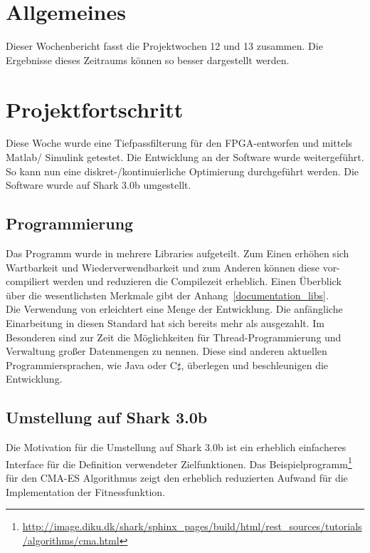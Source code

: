 \documentclass[a4paper,12pt,fleqn]{article}
\begin{document}
\setlength{\headheight}{36pt}

\begin{titlepage}



\end{titlepage}

\section[Allgemeines]{Allgemeines}
%
Dieser Wochenbericht fasst die Projektwochen 12 und 13 zusammen. Die Ergebnisse dieses Zeitraums können so besser dargestellt werden.
%
\section[Fortschritt]{Projektfortschritt}
%
Diese Woche wurde eine Tiefpassfilterung für den FPGA-entworfen und mittels Matlab/ Simulink getestet. Die Entwicklung an der Software wurde weitergeführt. So kann nun eine diskret-/kontinuierliche Optimierung durchgeführt werden. Die Software wurde auf Shark 3.0b umgestellt.


\subsection{Programmierung}
%
Das Programm wurde in mehrere Libraries aufgeteilt. Zum Einen erhöhen sich Wartbarkeit und Wiederverwendbarkeit und zum Anderen können diese vor-compiliert werden und reduzieren die Compilezeit erheblich. Einen Überblick über die wesentlichsten Merkmale gibt der Anhang~\ref{documentation_libs}.\\
Die Verwendung von  erleichtert eine Menge der Entwicklung. Die anfängliche Einarbeitung in diesen Standard hat sich bereits mehr als ausgezahlt. Im Besonderen sind zur Zeit die Möglichkeiten für Thread-Programmierung und Verwaltung großer Datenmengen zu nennen. Diese sind anderen aktuellen Programmiersprachen, wie Java oder C$\sharp$, überlegen und beschleunigen die Entwicklung.
%
\subsection{Umstellung auf Shark 3.0b}
%
Die Motivation für die Umstellung auf Shark 3.0b ist ein erheblich einfacheres Interface für die Definition verwendeter Zielfunktionen. Das Beispielprogramm\footnote{\url{http://image.diku.dk/shark/sphinx_pages/build/html/rest_sources/tutorials/algorithms/cma.html}} für den CMA-ES Algorithmus zeigt den erheblich reduzierten Aufwand für die Implementation der Fitnessfunktion.
\end{document}
